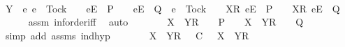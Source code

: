 \begin{isabellebody}
\ \isamarkupfalse%
\ {\isachardoublequoteopen}Y\ {\isasyminter}\ {\isacharbraceleft}e{\isachardot}\ e\ {\isasymnoteq}\ Tock\ {\isasymand}\ {\isasymrho}{\isacharprime}{\isacharprime}\ {\isacharat}\ {\isacharbrackleft}{\isacharbrackleft}e{\isacharbrackright}\isactrlsub E{\isacharbrackright}\ {\isasymin}\ P\ {\isasymand}\ {\isasymrho}{\isacharprime}{\isacharprime}\ {\isacharat}\ {\isacharbrackleft}{\isacharbrackleft}e{\isacharbrackright}\isactrlsub E{\isacharbrackright}\ {\isasymin}\ Q\ {\isasymor}\ e\ {\isacharequal}\ Tock\ {\isasymand}\ {\isasymrho}{\isacharprime}{\isacharprime}\ {\isacharat}\ {\isacharbrackleft}{\isacharbrackleft}X{\isacharprime}{\isacharbrackright}\isactrlsub R{\isacharcomma}\ {\isacharbrackleft}e{\isacharbrackright}\isactrlsub E{\isacharbrackright}\ {\isasymin}\ P\ {\isasymand}\ {\isasymrho}{\isacharprime}{\isacharprime}\ {\isacharat}\ {\isacharbrackleft}{\isacharbrackleft}X{\isacharprime}{\isacharbrackright}\isactrlsub R{\isacharcomma}\ {\isacharbrackleft}e{\isacharbrackright}\isactrlsub E{\isacharbrackright}\ {\isasymin}\ Q{\isacharbraceright}\ {\isacharequal}\ {\isacharbraceleft}{\isacharbraceright}{\isachardoublequoteclose}\isanewline
\ \ \ \ \isamarkupfalse%
\ assm{}\ inf{\isachardot}order{\isacharunderscore}iff\ \isamarkupfalse%
\ auto\isanewline
\ \ \isamarkupfalse%
\ \isamarkupfalse%
\ {\isachardoublequoteopen}{\isasymrho}{\isacharprime}{\isacharprime}\ {\isacharat}\ {\isacharbrackleft}X{\isacharprime}\ {\isasymunion}\ Y{\isacharbrackright}\isactrlsub R\ {\isacharhash}\ {\isasymsigma}{\isacharprime}{\isacharprime}\ {\isasymin}\ P\ {\isasymand}\ {\isasymrho}{\isacharprime}{\isacharprime}\ {\isacharat}\ {\isacharbrackleft}X{\isacharprime}\ {\isasymunion}\ Y{\isacharbrackright}\isactrlsub R\ {\isacharhash}\ {\isasymsigma}{\isacharprime}{\isacharprime}\ {\isasymin}\ Q{\isachardoublequoteclose}\isanewline
\ \ \ \ \isamarkupfalse%
\ {\isacharparenleft}simp\ add{\isacharcolon}\ {\isasymsigma}{\isacharunderscore}assms\ ind{\isacharunderscore}hyp{\isacharparenright}\isanewline
\ \ \isamarkupfalse%
\ \isamarkupfalse%
\ {\isachardoublequoteopen}{\isasymrho}{\isacharprime}\ {\isacharat}\ {\isacharbrackleft}X\ {\isasymunion}\ Y{\isacharbrackright}\isactrlsub R\ {\isacharhash}\ {\isasymsigma}{\isacharprime}\ {\isasymlesssim}\isactrlsub C\ {\isasymrho}{\isacharprime}{\isacharprime}\ {\isacharat}\ {\isacharbrackleft}X{\isacharprime}\ {\isasymunion}\ Y{\isacharbrackright}\isactrlsub R\ {\isacharhash}\ {\isasymsigma}{\isacharprime}{\isacharprime}{\isachardoublequoteclose}\isanewline

\end{isabellebody}

